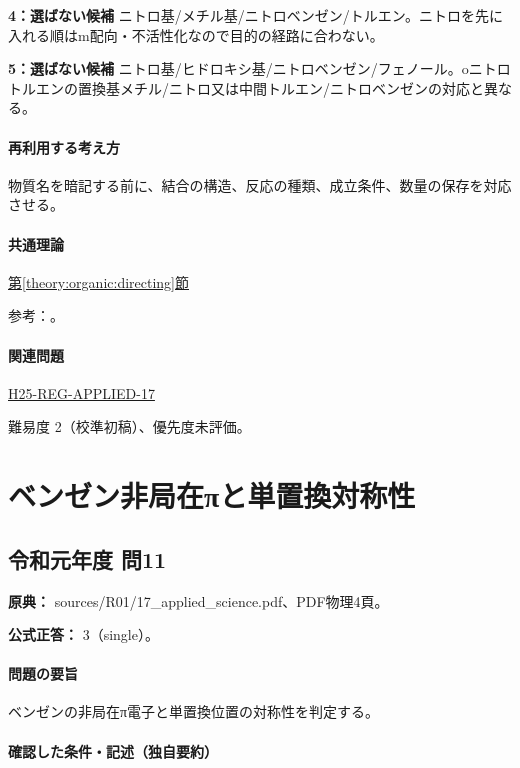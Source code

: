 \noindent\textbf{4：選ばない候補} ニトロ基/メチル基/ニトロベンゼン/トルエン。ニトロを先に入れる順はm配向・不活性化なので目的の経路に合わない。\par

\noindent\textbf{5：選ばない候補} ニトロ基/ヒドロキシ基/ニトロベンゼン/フェノール。oニトロトルエンの置換基メチル/ニトロ又は中間トルエン/ニトロベンゼンの対応と異なる。\par

\paragraph{再利用する考え方} 物質名を暗記する前に、結合の構造、反応の種類、成立条件、数量の保存を対応させる。

\paragraph{共通理論} \hyperref[theory:organic:directing]{第\ref*{theory:organic:directing}節}

\par 参考：\cite{organic_directing}。

\paragraph{関連問題} \hyperref[q:h25-reg-applied-17]{H25-REG-APPLIED-17}

\par 難易度 2（校準初稿）、優先度未評価。

\section{ベンゼン非局在πと単置換対称性}

\subsection{令和元年度 問11}
\label{q:r01-reg-applied-11}

\noindent\textbf{原典：} sources/R01/17\_applied\_science.pdf、PDF物理4頁。

\textbf{公式正答：} 3（single）。

\paragraph{問題の要旨} ベンゼンの非局在π電子と単置換位置の対称性を判定する。

\paragraph{確認した条件・記述（独自要約）}\mbox{}\par

